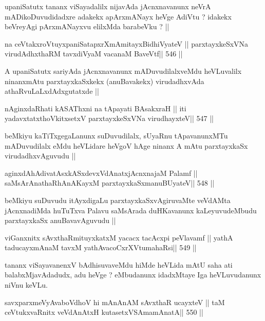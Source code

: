 \begin{artha}
upaniSatutx tananx viSayadalilx nijavAda jAcnxnavanunx neVrA
mADikoDuvudidadxre adakekx apArxmANayx heVge AdiVtu ? idakekx
beVreyAgi pArxmANayxvu elilxMda barabeVku ? ||
\end{artha}

\begin{shl}
na ceVtakxroVtuyxpaniSatapxrXmAmitayxBidhiVyateV ||
parxtayxkeSxVNa virudAdhxthaRM tavxdiVyaM vacanaM BaveVtf\hfill || 546 ||
\end{shl}

\begin{artha}
A upaniSatutx sariyAda jAcnxnavanunx mADuvudilalxveMdu heVLuvalilx
ninanxmAtu parxtayxkaSxkekx (anuBavakekx) virudadhxvAda
athaRvuLaLxdAdxgutatxde ||
\end{artha}

\begin{shl}
nAginxdaRhati kASAThxni na tApayati BAsakxraH ||
iti yadavxtatxthoVkitxsetxV parxtayxkeSxVNa virudhayxteV\hfill || 547 ||
\end{shl}

\begin{artha}
beMkiyu kaTiTxgegaLanunx suDuvudilalx, sUyaRnu tApavanunxMTu
mADuvudilalx eMdu heVLidare heVgoV hAge ninanx A mAtu parxtayxkaSx
virudadhxvAguvudu ||
\end{artha}

\begin{shl}
aginxdAhAdivatAsxkASxdevxVdAnatxjAcnxnajaM Palamf ||
saMsArAnathaRhAnAKayxM parxtayxkaSxmanuBUyateV\hfill || 548 ||
\end{shl}

\begin{artha}
beMkiyu suDuvudu itAyxdigaLu parxtayxkaSxvAgiruvaMte veVdAMta
jAcnxnadiMda huTuTxva Palavu saMsArada duHKavanunx kaLeyuvudeMbudu
parxtayxkaSx anuBavavAguvudu ||
\end{artha}

\begin{shl}
viGanxnitx sAvxthaRmituyxkatxM yacacx tacAcxpi peVlavamf ||
yathA taducayxmAnaM tavxM yathAvacoCxrXVtumahaRsi\hfill || 549 ||
\end{shl}

\begin{artha}
tananx viSayavanenxV bAdhisuvaveMdu hiMde heVLida mAtU saha ati
balabxMjavAdadudx, adu heVge ? eMbudanunx idadxMtaye Iga heVLuvudanunx
niVnu keVLu.
\end{artha}

\begin{shl}
savxparxmeVyAvaboVdhoV hi mAnAnAM sAvxthaR ucayxteV ||
taM ceVtukxvaRnitx veVdAnAtxH kutasetxVSAmamAnatA\hfill || 550 ||
\end{shl}

